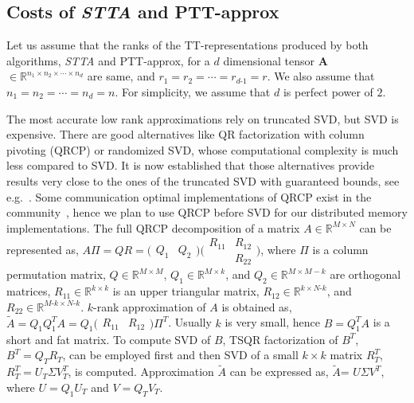 \documentclass[sigconf]{acmart}
\makeatletter
\newcommand{\tensor}[1]{{\cal\textbf{#1}\xspace}}
\newcommand{\otta}{{\it STTA}\xspace}
\DeclareRobustCommand*\cal{\@fontswitch\relax\mathcal}
\makeatother
\begin{document}
\subsection{Costs of \otta and PTT-approx}
\label{sec:computationCost}
Let us assume that the ranks of the TT-representations produced by both algorithms, \otta and PTT-approx, for a $d$ dimensional tensor \tensor{A} $\in \mathbb{R}^{n_1 \times n_2 \times \cdots \times n_d}$ are same, and $r_1=r_2=\cdots=r_{d\text{-}1}=r$. We also assume that $n_1=n_2=\cdots=n_d=n$. For simplicity, we assume that $d$ is perfect power of $2$. 


The most accurate low rank approximations rely on truncated SVD, but SVD is expensive. There are good alternatives like QR factorization with column pivoting (QRCP) or randomized SVD, whose computational complexity is much less compared to SVD. It is now established that those alternatives provide results very close to the ones of the truncated SVD with guaranteed bounds, see e.g.~\cite{demmel19:_improv_analy_and_unified_persp}. Some communication optimal implementations of QRCP exist in the community~\cite{beaupere-tournamentpivoting}, hence we plan to use QRCP before SVD for our distributed memory implementations. The full QRCP decomposition of a matrix $A\in \mathbb{R}^{M\times N}$ can be represented as, $A\Pi = QR = \big(\begin{smallmatrix} Q_1 & Q_2 \end{smallmatrix}\big) \big(\begin{smallmatrix}R_{11} & R_{12}\\ & R_{22} \end{smallmatrix}\big)$, where $\Pi$ is a column permutation matrix, $Q\in \mathbb{R}^{M\times M}$, $Q_1\in \mathbb{R}^{M\times k}$, and $Q_2\in \mathbb{R}^{M\times M-k}$ are orthogonal matrices, $R_{11} \in \mathbb{R}^{k\times k}$ is an upper triangular matrix, $R_{12}\in\mathbb{R}^{k\times N\text{-}k}$, and $R_{22}\in\mathbb{R}^{M\text{-}k\times N\text{-}k}$. $k$-rank approximation of $A$ is obtained as, $\tilde{A} = Q_1Q_1^TA = Q_1 \big(\begin{smallmatrix} R_{11} & R_{12} \end{smallmatrix}\big)\Pi^T$.
Usually $k$ is very small, hence $B=Q_1^TA$ is a short and fat matrix. To compute SVD of $B$, TSQR factorization of $B^T$, $B^T = Q_T R_T$, can be employed first and then SVD of a small $k\times k$ matrix $R_T^T$, $R_T^T = U_T\Sigma V^T_T$, is computed. Approximation $\tilde{A}$ can be expressed as, $\tilde{A}$= $U\Sigma V^T$, where $U=Q_1U_T$ and $V=Q_TV_T$. 
\end{document}
